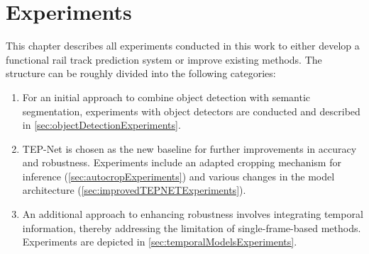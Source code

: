 \chapter{Experiments}
\label{sec:experiments}


This chapter describes all experiments conducted in this work to either develop a functional rail track prediction system or improve existing methods.
The structure can be roughly divided into the following categories:

\begin{enumerate}
    \item For an initial approach to combine object detection with semantic segmentation, experiments with object detectors are conducted and described in \autoref{sec:objectDetectionExperiments}.
    \item TEP-Net \cite{tepNet2024} is chosen as the new baseline for further improvements in accuracy and robustness. Experiments include an adapted cropping mechanism for inference (\autoref{sec:autocropExperiments}) and various changes in the model architecture (\autoref{sec:improvedTEPNETExperiments}).
    \item An additional approach to enhancing robustness involves integrating temporal information, thereby addressing the limitation of single-frame-based methods. Experiments are depicted in \autoref{sec:temporalModelsExperiments}.
\end{enumerate}












